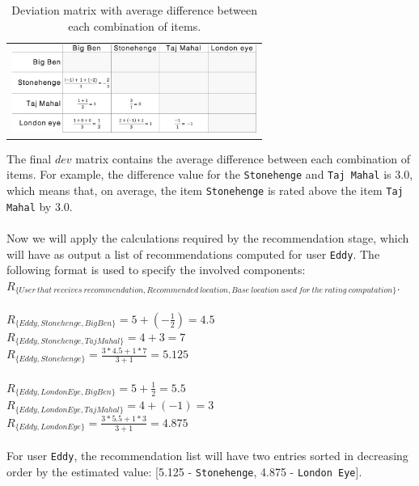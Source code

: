 \begin{center}
\begin{table}
	\centering
    \caption{Deviation matrix with average difference between each combination of items.}
    \label{tab:handCalcStep3}
    \begin{tabular}{c}
	\includegraphics[width=8cm]{./images/tables/table_slope_one_step_by_step_step_3.jpg}    
    \end{tabular}
    \end{table}
\end{center}
The final $dev$ matrix contains the average difference between each combination of items. For example, the difference value for the \verb"Stonehenge" and \verb"Taj Mahal" is 3.0, which means that, on average, the item \verb"Stonehenge" is rated above the item \verb"Taj Mahal" by 3.0.\\
\\
Now we will apply the calculations required by the recommendation stage, which will have as output a list of recommendations computed for user \verb"Eddy". The following format is used to specify the involved components:\\ 
$R_{\{User~that~receives~recommendation, Recommended~location, Base~location~used~for~the~rating~computation\}}$.\\
\\
$R_{\{Eddy, Stonehenge, Big Ben\}} = 5 + (-\frac{1}{2}) = 4.5$\\
$R_{\{Eddy, Stonehenge, Taj Mahal\}} = 4 + 3 = 7$\\
$R_{\{Eddy, Stonehenge\}} = \frac{3 * 4.5 + 1 * 7}{3 + 1} = 5.125$\\
\\
$R_{\{Eddy, London Eye, Big Ben\}} = 5 + \frac{1}{2} = 5.5$\\
$R_{\{Eddy, London Eye, Taj Mahal\}} = 4 + (-1) = 3$\\
$R_{\{Eddy, London Eye\}} = \frac{3 * 5.5 + 1 * 3}{3 + 1} = 4.875$\\
\\
For user \verb"Eddy", the recommendation list will have two entries sorted in decreasing order by the estimated value: [5.125 - \verb"Stonehenge", 4.875 - \verb"London Eye"].

